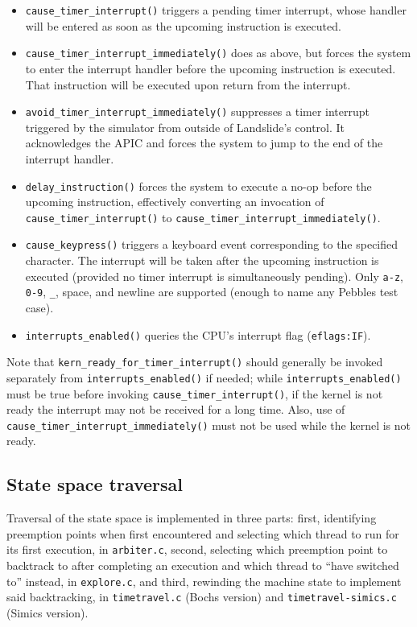 \begin{itemize}
	\item {\tt cause\_timer\_interrupt()}
		triggers a pending timer interrupt, whose handler will be entered as soon as the upcoming instruction is executed.
	\item {\tt cause\_timer\_interrupt\_immediately()}
		does as above, but forces the system to enter the interrupt handler before the upcoming instruction is executed.
		That instruction will be executed upon return from the interrupt.
	\item {\tt avoid\_timer\_interrupt\_immediately()}
		suppresses a timer interrupt triggered by the simulator from outside of Landslide's control.
		It acknowledges the APIC and forces the system to jump to the end of the interrupt handler.
	\item {\tt delay\_instruction()}
		forces the system to execute a no-op before the upcoming instruction,
		effectively converting an invocation of {\tt cause\_timer\_interrupt()} to {\tt cause\_timer\_interrupt\_immediately()}.
	\item {\tt cause\_keypress()} triggers a keyboard event corresponding to the specified character.
		The interrupt will be taken after the upcoming instruction is executed
		(provided no timer interrupt is simultaneously pending).
		Only {\tt a-z}, {\tt 0-9}, {\tt \_}, space, and newline are supported (enough to name any Pebbles test case).
	\item {\tt interrupts\_enabled()} queries the CPU's interrupt flag ({\tt eflags:IF}).
\end{itemize}

Note that {\tt kern\_ready\_for\_timer\_interrupt()} should generally be invoked separately
from {\tt interrupts\_enabled()} if needed;
while {\tt interrupts\_enabled()} must be true before invoking {\tt cause\_timer\_interrupt()},
if the kernel is not ready the interrupt may not be received for a long time.
Also, use of {\tt cause\_timer\_interrupt\_immediately()} must not be used while the kernel is not ready.


\subsection{State space traversal}

Traversal of the state space is implemented in three parts:
first, identifying preemption points when first encountered and selecting which thread to run for its first execution, in {\tt arbiter.c},
second, selecting which preemption point to backtrack to after completing an execution
and which thread to ``have switched to'' %
instead, in {\tt explore.c},
and third, rewinding the machine state to implement said backtracking,
in {\tt timetravel.c} (Bochs version) and {\tt timetravel-simics.c} (Simics version).

